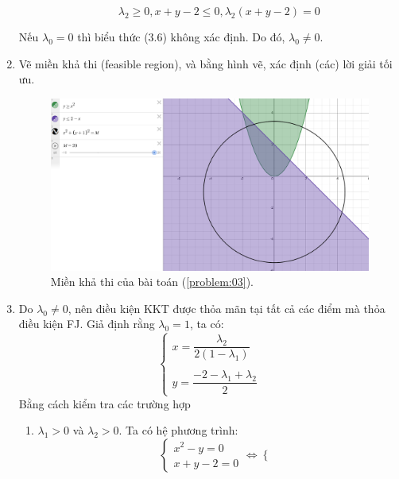 \begin{solution}
\begin{enumerate}[label=(\alph*)]
\begin{itemize}
\begin{equation}
                \lambda_2 \geq 0, x + y - 2 \leq 0, \lambda_2(x + y - 2) = 0
            \end{equation}
        \end{itemize}
        Nếu $\lambda_0 = 0$ thì biểu thức (3.6) không xác định. Do đó, $\lambda_0 \ne 0$.
        \item Vẽ miền khả thi (feasible region), và bằng hình vẽ, xác định (các) lời giải tối ưu.
        \begin{figure}[h!]
            \includegraphics[width=0.85\linewidth]{figures/BT03.png}
            \caption{Miền khả thi của bài toán (\ref{problem:03}).}
            \label{fig:feasible_region_problem_03}
        \end{figure}
        \item Do $\lambda_ 0 \ne 0$, nên điều kiện KKT được thỏa mãn tại tất cả các điểm mà thỏa điều kiện FJ. Giả định rằng $\lambda_0 = 1$, ta có:
        \begin{equation}
            \begin{cases}
                x = \dfrac{\lambda_2}{2(1 - \lambda_1)} \\\\
                y = \dfrac{-2- \lambda_1 + \lambda_2}{2}
            \end{cases}
        \end{equation}
        Bằng cách kiểm tra các trường hợp
        \begin{enumerate}[label=(\roman*)]
            \item $\lambda_1 > 0$ và $\lambda_2 > 0$. Ta có hệ phương trình:
            \begin{equation}
                \begin{cases}
                    x^2 - y = 0 \\ 
                    x + y - 2 = 0
                \end{cases}
                \Leftrightarrow 
                \begin{cases}

\end{cases}
\end{equation}
\end{enumerate}
\end{enumerate}
\end{solution}
